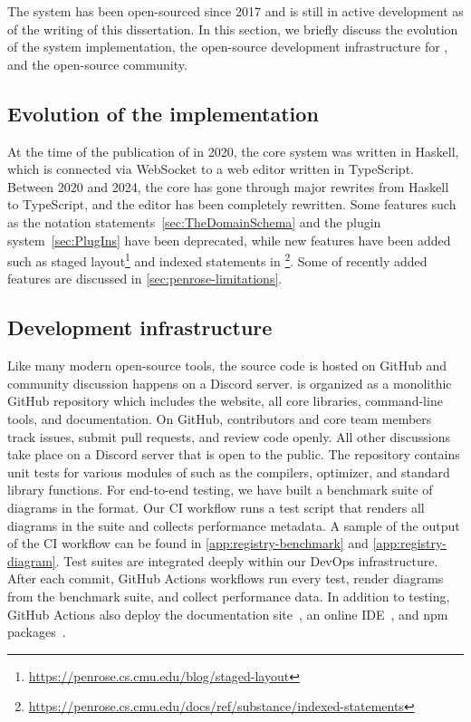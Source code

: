 The \Penrose{} system has been open-sourced since 2017 and is still in active development as of the writing of this dissertation. In this section, we briefly discuss the evolution of the system implementation, the open-source development infrastructure for \Penrose, and the open-source community. 

\subsection{Evolution of the implementation}

At the time of the publication of \cite{penrose} in 2020, the core system was written in Haskell, which is connected via WebSocket to a web editor written in TypeScript. Between 2020 and 2024, the core has gone through major rewrites from Haskell to TypeScript, and the editor has been completely rewritten. Some features such as the notation statements~\cref{sec:TheDomainSchema} and the plugin system~\cref{sec:PlugIns} have been deprecated, while new features have been added such as staged layout\footnote{\url{https://penrose.cs.cmu.edu/blog/staged-layout}} and indexed statements in \Substance{}\footnote{\url{https://penrose.cs.cmu.edu/docs/ref/substance/indexed-statements}}. Some of recently added features are discussed in \cref{sec:penrose-limitations}.

\subsection{Development infrastructure} 

Like many modern open-source tools, the \Penrose source code is hosted on GitHub and community discussion happens on a Discord server. \Penrose is organized as a monolithic GitHub repository which includes the website, all core libraries, command-line tools, and documentation. On GitHub, contributors and core team members track issues, submit pull requests, and review code openly. All other discussions take place on a Discord server that is open to the public. The repository contains unit tests for various modules of \Penrose such as the compilers, optimizer, and standard library functions. For end-to-end testing, we have built a benchmark suite of diagrams in the \Penrose format. Our CI workflow runs a test script that renders all diagrams in the suite and collects performance metadata. A sample of the output of the CI workflow can be found in \cref{app:registry-benchmark} and \cref{app:registry-diagram}. Test suites are integrated deeply within our DevOps infrastructure. After each commit, GitHub Actions workflows run every test, render diagrams from the benchmark suite, and collect performance data. In addition to testing, GitHub Actions also deploy the \Penrose documentation site~\cite{penrose-docs}, an online IDE~\cite{penrose-ide}, and npm packages~\cite{penrose-npm}. 

